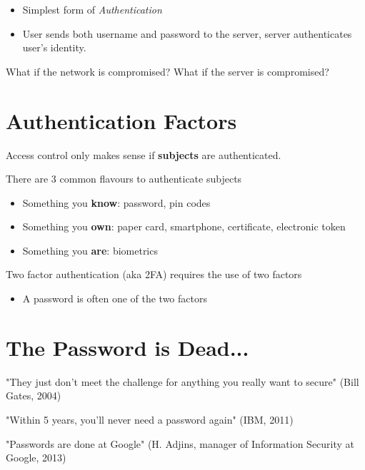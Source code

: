 \documentclass[11pt]{article}
\begin{document}
\begin{itemize}
	\item Simplest form of \textit{Authentication}
	\item User sends both username and password to the server, server authenticates user's identity. 
\end{itemize}

\begin{tcolorbox}[
  colback=orange!15,     %
  colframe=black!50,    %
  boxrule=1pt,       %
  arc=3mm,             %
  left=4mm, right=4mm, top=2mm, bottom=2mm %
]
What if the network is compromised? What if the server is compromised?
\end{tcolorbox}

\section*{Authentication Factors}

Access control only makes sense if \textbf{subjects} are authenticated. 

There are 3 common flavours to authenticate subjects

\begin{itemize}
	\item Something you \textbf{know}: password, pin codes
	\item Something you \textbf{own}: paper card, smartphone, certificate, electronic token
	\item Something you \textbf{are}: biometrics
\end{itemize}

Two factor authentication (aka 2FA) requires the use of two factors
\begin{itemize}
	\item A password is often one of the two factors
\end{itemize}

\section*{The Password is Dead...}

"They just don't meet the challenge for anything you really want to secure" (Bill Gates, 2004)

"Within 5 years, you'll never need a password again" (IBM, 2011)

"Passwords are done at Google" (H. Adjins, manager of Information Security at Google, 2013) 
\end{document}
